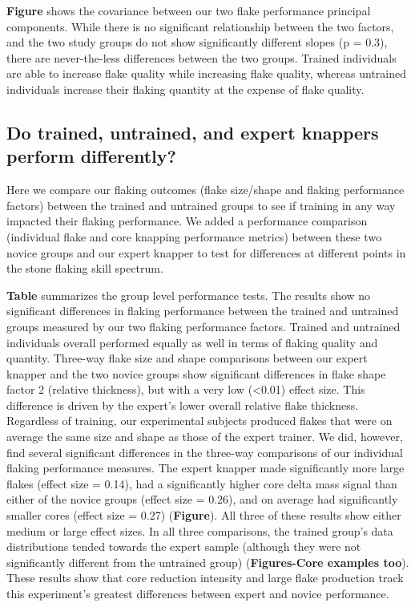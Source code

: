 \documentclass[smallextended]{svjour3}       %
\begin{document}
\textbf{Figure} shows the covariance between our two flake performance
principal components. While there is no significant relationship between
the two factors, and the two study groups do not show significantly
different slopes (p = 0.3), there are never-the-less differences between
the two groups. Trained individuals are able to increase flake quality
while increasing flake quality, whereas untrained individuals increase
their flaking quantity at the expense of flake quality.

\hypertarget{do-trained-untrained-and-expert-knappers-perform-differently}{%
\subsection{\texorpdfstring{\textbf{Do trained, untrained, and expert
knappers perform
differently?}}{Do trained, untrained, and expert knappers perform differently?}}\label{do-trained-untrained-and-expert-knappers-perform-differently}}

Here we compare our flaking outcomes (flake size/shape and flaking
performance factors) between the trained and untrained groups to see if
training in any way impacted their flaking performance. We added a
performance comparison (individual flake and core knapping performance
metrics) between these two novice groups and our expert knapper to test
for differences at different points in the stone flaking skill
spectrum.~

\textbf{Table} summarizes the group level performance tests. The results
show no significant differences in flaking performance between the
trained and untrained groups measured by our two flaking performance
factors. Trained and untrained individuals overall performed equally as
well in terms of flaking quality and quantity. Three-way flake size and
shape comparisons between our expert knapper and the two novice groups
show significant differences in flake shape factor 2 (relative
thickness), but with a very low (\textless0.01) effect size. This
difference is driven by the expert's lower overall relative flake
thickness. Regardless of training, our experimental subjects produced
flakes that were on average the same size and shape as those of the
expert trainer. We did, however, find several significant differences in
the three-way comparisons of our individual flaking performance
measures. The expert knapper made significantly more large flakes
(effect size = 0.14), had a significantly higher core delta mass signal
than either of the novice groups (effect size = 0.26), and on average
had significantly smaller cores (effect size = 0.27) (\textbf{Figure}).
All three of these results show either medium or large effect sizes. In
all three comparisons, the trained group's data distributions tended
towards the expert sample (although they were not significantly
different from the untrained group) (\textbf{Figures-Core examples
too}). These results show that core reduction intensity and large flake
production track this experiment's greatest differences between expert
and novice performance.
\end{document}
